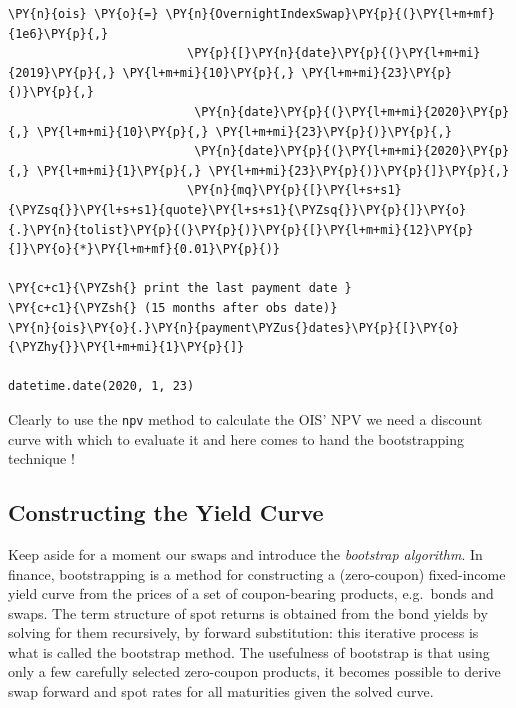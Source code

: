 \begin{tcolorbox}[breakable, size=fbox, boxrule=1pt, pad at break*=1mm, colback=cellbackground, colframe=cellborder]
\begin{Verbatim}[commandchars=\\\{\}]
\PY{n}{ois} \PY{o}{=} \PY{n}{OvernightIndexSwap}\PY{p}{(}\PY{l+m+mf}{1e6}\PY{p}{,}
                         \PY{p}{[}\PY{n}{date}\PY{p}{(}\PY{l+m+mi}{2019}\PY{p}{,} \PY{l+m+mi}{10}\PY{p}{,} \PY{l+m+mi}{23}\PY{p}{)}\PY{p}{,}
                          \PY{n}{date}\PY{p}{(}\PY{l+m+mi}{2020}\PY{p}{,} \PY{l+m+mi}{10}\PY{p}{,} \PY{l+m+mi}{23}\PY{p}{)}\PY{p}{,}
                          \PY{n}{date}\PY{p}{(}\PY{l+m+mi}{2020}\PY{p}{,} \PY{l+m+mi}{1}\PY{p}{,} \PY{l+m+mi}{23}\PY{p}{)}\PY{p}{]}\PY{p}{,}
                         \PY{n}{mq}\PY{p}{[}\PY{l+s+s1}{\PYZsq{}}\PY{l+s+s1}{quote}\PY{l+s+s1}{\PYZsq{}}\PY{p}{]}\PY{o}{.}\PY{n}{tolist}\PY{p}{(}\PY{p}{)}\PY{p}{[}\PY{l+m+mi}{12}\PY{p}{]}\PY{o}{*}\PY{l+m+mf}{0.01}\PY{p}{)}

\PY{c+c1}{\PYZsh{} print the last payment date }
\PY{c+c1}{\PYZsh{} (15 months after obs date)}
\PY{n}{ois}\PY{o}{.}\PY{n}{payment\PYZus{}dates}\PY{p}{[}\PY{o}{\PYZhy{}}\PY{l+m+mi}{1}\PY{p}{]}

datetime.date(2020, 1, 23)
\end{Verbatim}
\end{tcolorbox}

Clearly to use the \texttt{npv} method to calculate the OIS' NPV we need a discount curve with which to evaluate it and here comes to hand the bootstrapping technique !

\subsection{Constructing the Yield Curve}\label{the-bootstrapping-technique}

Keep aside for a moment our swaps and introduce the \emph{bootstrap
algorithm}. In finance, bootstrapping is a method for constructing a
(zero-coupon) fixed-income yield curve from the prices of a set of
coupon-bearing products, e.g.~bonds and swaps. The term structure of
spot returns is obtained from the bond yields by solving for them
recursively, by forward substitution: this iterative process is what is
called the bootstrap method. The usefulness of bootstrap is that using
only a few carefully selected zero-coupon products, it becomes possible
to derive swap forward and spot rates for all maturities given the
solved curve.

